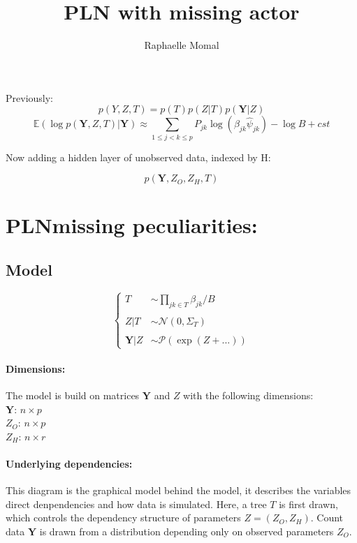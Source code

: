 \documentclass[11pt,a4paper]{article}
\author{Raphaelle Momal}
\title{PLN with missing actor}
\newcommand{\Ybf}{\boldsymbol{Y}}
\newcommand{\Esp}{\mathds{E}}
\newcommand{\edgeunit}{1.5}
\begin{document}
\maketitle
\vspace{3cm}
\tableofcontents
\newpage
Previously:
$$ p(Y,Z,T) = p(T)p(Z|T)p(\Ybf|Z)$$
$$ \Esp(\log p(\Ybf,Z,T)|\Ybf) \approx \sum_{1 \leq j < k \leq p} P_{jk} \log\left(\beta_{jk} \hat{\psi}_{jk}\right) - \log B + cst$$

Now adding a hidden layer of unobserved data, indexed by H:

$$ p(\Ybf,Z_O,Z_H,T)$$
\section{PLNmissing peculiarities:}

\subsection{Model}

$$\left\{\begin{array}{rl}
T & \sim\prod_{jk \in T} \beta_{jk}/B \\\\
Z|T& \sim\mathcal{N}(0,\Sigma_T)\\\\
\Ybf|Z&\sim\mathcal{P}( \exp( Z+...) )
\end{array} \right.$$

\paragraph{Dimensions:}
The model is build on matrices $\Ybf$ and $Z$ with the following dimensions:\\
$\Ybf$: $n\times p$\\
$Z_O$: $n\times p$\\
$Z_H$: $n\times r$


\paragraph{Underlying dependencies:} This diagram is the graphical model behind the model, it describes the variables direct denpendencies and how data is simulated. Here, a tree $T$ is first drawn, which controls the dependency structure of parameters $Z = (Z_O,Z_H)$. Count data $\Ybf$ is drawn from a distribution depending only on observed parameters $Z_O$.
\begin{center}
\end{center}
\end{document}
